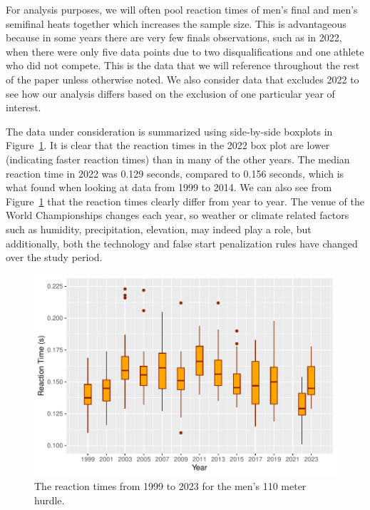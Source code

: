 \documentclass[12pt, letterpaper, titlepage]{article}
\newcommand{\eds}[1]{\textcolor{red}{EDS: (#1)}}
\newcommand{\of}[1]{\textcolor{violet}{OF: #1}}
\begin{document}
For analysis purposes, we will often pool reaction times of men's final and 
men's semifinal heats together which increases the sample size. This is 
advantageous because in some years there are very few finals observations, such
as in 2022, when there were only five data points due to two disqualifications 
and one athlete who did not compete.  This is the data that we will reference
throughout the rest of the paper unless otherwise noted. We also consider data 
that excludes 2022 to see how our analysis differs based on the exclusion of one
particular year of interest.


The data under consideration is summarized using side-by-side boxplots in 
Figure~\ref{fig:Boxplot}.  It is clear that the reaction times in the 2022
box plot are lower (indicating faster reaction times) than in many of the other
years.  The median reaction time in 2022 was 0.129 seconds,  compared to 0.156
seconds, which is what \citet{brosnan2017effects} found when looking at data
from 1999 to 2014. We can also see from Figure~\ref{fig:Boxplot} that the 
reaction times clearly differ from year to year. The venue of the World 
Championships changes each year, so weather or climate related factors such as 
humidity, precipitation, elevation, may indeed play a role, but additionally,
both the technology and false start penalization rules have changed over the 
study period.


\begin{figure}[tbp]
  \centering
  \includegraphics{Boxplot}
  \caption{The reaction times from 1999 to 2023 for the men's 110 meter hurdle.}
  \label{fig:Boxplot}
\end{figure}
\end{document}
